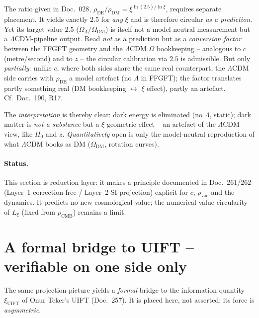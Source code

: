 The ratio given in Doc.~028,
$\rho_{\text{DE}}/\rho_{\text{DM}}=\xi^{\ln(2.5)/\ln\xi}$, requires separate
placement. It yields exactly $2.5$ for \emph{any} $\xi$ and is therefore
circular \emph{as a prediction}. Yet its target value $2.5$
($\Omega_\Lambda/\Omega_{\text{DM}}$) is itself not a model-neutral measurement
but a $\Lambda$CDM-pipeline output. Read \emph{not} as a prediction but as a
\emph{conversion factor} between the FFGFT geometry and the $\Lambda$CDM
$\Omega$ bookkeeping -- analogous to $c$ (metre/second) and to $z$ -- the
circular calibration via $2.5$ is admissible. But only \emph{partially}: unlike
$c$, where both sides share the same real counterpart, the $\Lambda$CDM side
carries with $\rho_{\text{DE}}$ a model artefact (no $\Lambda$ in FFGFT); the
factor translates partly something real (DM bookkeeping $\leftrightarrow$ $\xi$
effect), partly an artefact. Cf.\ Doc.~190, R17.

The \emph{interpretation} is thereby clear: dark energy is eliminated (no
$\Lambda$, static); dark matter is \emph{not a substance} but a $\xi$-geometric
effect -- an artefact of the $\Lambda$CDM view, like $H_0$ and $z$.
\emph{Quantitatively} open is only the model-neutral reproduction of what
$\Lambda$CDM books as DM ($\Omega_{\text{DM}}$, rotation curves).

\paragraph{Status.} This section is reduction layer: it makes a principle
documented in Doc.~261/262 (Layer~1 correction-free / Layer~2 SI projection)
explicit for $c$, $\rho_{\text{vac}}$ and the dynamics. It predicts no new
cosmological value; the numerical-value circularity of $L_\xi$ (fixed from
$\rho_{\text{CMB}}$) remains a limit.

\section{A formal bridge to UIFT -- verifiable on one side only}

The same projection picture yields a \emph{formal} bridge to the information
quantity $\xi_{\text{UIFT}}$ of Onur Teker's UIFT (Doc.~257). It is placed here,
not asserted: its force is \emph{asymmetric}.

